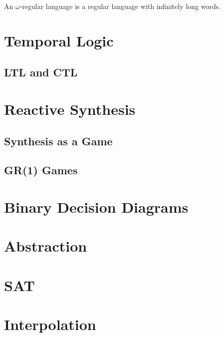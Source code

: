 An $\omega$-regular language is a regular language with infinitely long words.

\section{Temporal Logic}

\subsection{LTL and CTL}

\section{Reactive Synthesis}

\subsection{Synthesis as a Game}

\subsection{GR(1) Games}

\section{Binary Decision Diagrams}

\section{Abstraction}

\section{SAT}

\section{Interpolation}

